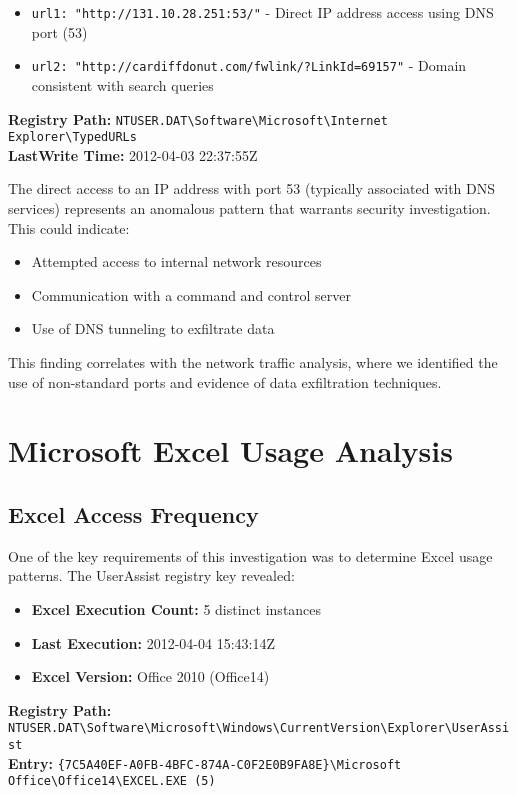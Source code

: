 \begin{itemize}
    \item \texttt{url1: "http://131.10.28.251:53/"} - Direct IP address access using DNS port (53)
    \item \texttt{url2: "http://cardiffdonut.com/fwlink/?LinkId=69157"} - Domain consistent with search queries
\end{itemize}

\textbf{Registry Path:} \texttt{NTUSER.DAT\textbackslash Software\textbackslash Microsoft\textbackslash Internet Explorer\textbackslash TypedURLs}\\
\textbf{LastWrite Time:} 2012-04-03 22:37:55Z

The direct access to an IP address with port 53 (typically associated with DNS services) represents an anomalous pattern that warrants security investigation. This could indicate:
\begin{itemize}
    \item Attempted access to internal network resources
    \item Communication with a command and control server
    \item Use of DNS tunneling to exfiltrate data
\end{itemize}

This finding correlates with the network traffic analysis, where we identified the use of non-standard ports and evidence of data exfiltration techniques.

\section{Microsoft Excel Usage Analysis}
\subsection{Excel Access Frequency}
One of the key requirements of this investigation was to determine Excel usage patterns. The UserAssist registry key revealed:

\begin{itemize}
    \item \textbf{Excel Execution Count:} 5 distinct instances
    \item \textbf{Last Execution:} 2012-04-04 15:43:14Z
    \item \textbf{Excel Version:} Office 2010 (Office14)
\end{itemize}

\textbf{Registry Path:} \texttt{NTUSER.DAT\textbackslash Software\textbackslash Microsoft\textbackslash Windows\textbackslash CurrentVersion\textbackslash Explorer\textbackslash UserAssist}\\
\textbf{Entry:} \texttt{\{7C5A40EF-A0FB-4BFC-874A-C0F2E0B9FA8E\}\textbackslash Microsoft Office\textbackslash Office14\textbackslash EXCEL.EXE (5)}

